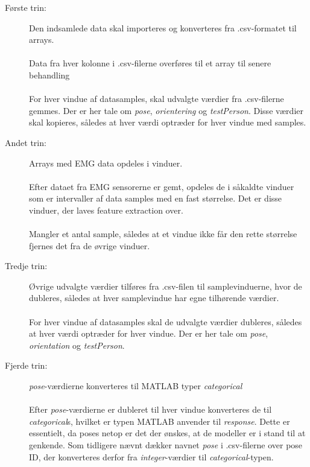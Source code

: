 \begin{description}
	\item[Første trin:] Den indsamlede data skal importeres og konverteres fra .csv-formatet til arrays.\\\\
		Data fra hver kolonne i .csv-filerne overføres til et array til senere behandling
	\\\\
	For hver vindue af datasamples, skal udvalgte værdier fra .csv-filerne gemmes. Der er her tale om \textit{pose}, \textit{orientering} og \textit{testPerson}. Disse værdier skal kopieres, således at hver værdi optræder for hver vindue med samples.

  \item[Andet trin:] Arrays med EMG data opdeles i vinduer. 
  \\\\
  Efter dataet fra EMG sensorerne er gemt, opdeles de i såkaldte vinduer som er intervaller af data samples med en fast størrelse. Det er disse vinduer, der laves feature extraction over.
  \\\\
  Mangler et antal sample, således at et vindue ikke får den rette størrelse fjernes det fra de øvrige vinduer. 
    \item[Tredje trin:] Øvrige udvalgte værdier tilføres fra .csv-filen til samplevinduerne, hvor de dubleres, således at hver samplevindue har egne tilhørende værdier.
  \\\\
  For hver vindue af datasamples skal de udvalgte værdier dubleres, således at hver værdi optræder for hver vindue. Der er her tale om \textit{pose}, \textit{orientation} og \textit{testPerson}.
  
  \item[Fjerde trin:] \textit{pose}-værdierne konverteres til MATLAB typer \textit{categorical}
  \\\\
  Efter \textit{pose}-værdierne er dubleret til hver vindue konverteres de til \textit{categorical}s, hvilket er typen MATLAB anvender til \textit{response}. Dette er essentielt, da poses netop er det der ønskes, at de modeller er i stand til at genkende. Som tidligere nævnt dækker navnet \textit{pose} i .csv-filerne over pose ID, der konverteres derfor fra \textit{integer}-værdier til \textit{categorical}-typen. 
\end{description}
